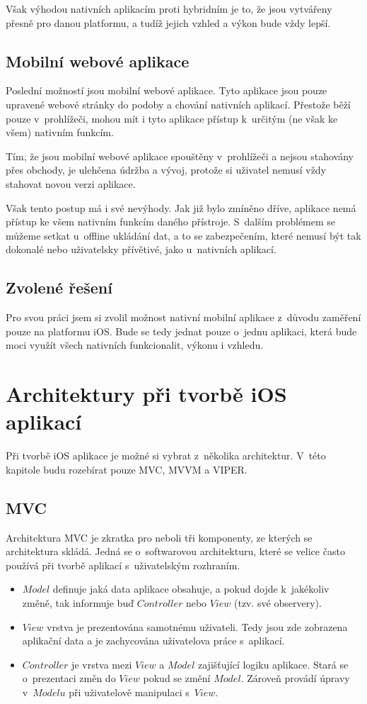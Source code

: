 \documentclass[thesis=M,czech]{FITthesis}[2012/06/26]
\begin{document}
Však výhodou nativních aplikacím proti hybridním je to, že jsou vytvářeny přesně pro danou platformu, a tudíž jejich vzhled a výkon bude vždy lepší. \cite{upwork}

\subsection{Mobilní webové aplikace}
Poslední možností jsou mobilní webové aplikace. Tyto aplikace jsou pouze upravené webové stránky do podoby a chování nativních aplikací. Přestože běží pouze v~prohlížeči, mohou mít i tyto aplikace přístup k~určitým (ne však ke všem) nativním funkcím. \cite{Nielsen}

Tím, že jsou mobilní webové aplikace spouštěny v~prohlížeči a nejsou stahovány přes obchody, je ulehčena údržba a vývoj, protože si uživatel nemusí vždy stahovat novou verzi aplikace.

Však tento postup má i své nevýhody. Jak již bylo zmíněno dříve, aplikace nemá přístup ke všem nativním funkcím daného přístroje. S~dalším problémem se můžeme setkat u~offline ukládání dat, a to se zabezpečením, které nemusí být tak dokonalé nebo uživatelsky přívětivé, jako u~nativních aplikací.  \cite{saleforce}

\subsection{Zvolené řešení}
Pro svou práci jsem si zvolil možnost nativní mobilní aplikace z~důvodu zaměření pouze na platformu iOS. Bude se tedy jednat pouze o~jednu aplikaci, která bude moci využít všech nativních funkcionalit, výkonu i vzhledu.

\section{Architektury při tvorbě iOS aplikací}
Při tvorbě iOS aplikace je možné si vybrat z~několika architektur. V~této kapitole budu rozebírat pouze MVC, MVVM a VIPER.

\subsection{MVC}
Architektura MVC je zkratka pro  neboli tři komponenty, ze kterých se architektura skládá. Jedná se o~softwarovou architekturu, které se velice často používá při tvorbě aplikací s~uživatelským rozhraním. \cite{MVCMozilla}
\begin{itemize}
\item $Model$ definuje jaká data aplikace obsahuje, a pokud dojde k~jakékoliv změně, tak informuje buď $Controller$ nebo $View$ (tzv. své observery). \cite{MVCGoogle}
\item $View$ vrstva je prezentována samotnému uživateli. Tedy jsou zde zobrazena aplikační data a je zachycována uživatelova práce s~aplikací.\cite{MVCMozilla}
\item $Controller$ je vrstva mezi $View$ a $Model$ zajišťující logiku aplikace. Stará se o~prezentaci změn do $View$ pokud se změní $Model$. Zároveň provádí úpravy v~$Modelu$ při uživatelově manipulaci s~$View$.  \cite{MVCGoogle}
\end{itemize}
\end{document}
